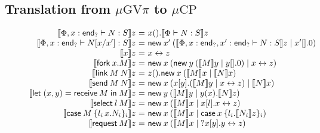 \documentclass[orivec,envcountsame]{llncs}
\makeatletter
\newcommand{\cpdual}[1]{#1^\perp}
\newcommand{\interm}{\mkwd{end}_?}
\newcommand{\cptyp}[2]{#1 \vdash #2}
\newcommand{\gvtyp}[3]{#1 \vdash #2 : #3}
\newcommand{\mkwd}[1]{\mathsf{#1}}
\newcommand{\link}[2]{#1 \leftrightarrow #2}
\newcommand{\cut}[4]{\mkwd{new}\:#1 \: (#3 \mid #4)}
\newcommand{\derelict}[2]{{?#1[#2]}}
\renewcommand{\case}[2]{\mkwd{case}\:#1\:\{#2\}}
\newcommand{\gvsend}[2]{\mkwd{send}\:#1\:#2}
\newcommand{\gvreceive}[1]{\mkwd{receive}\:#1}
\newcommand{\gvlet}[3]{\mkwd{let}\;#1 = #2\;\mkwd{in}\;#3}
\newcommand{\gvselect}[2]{\mkwd{select}\:#1\:#2}
\newcommand{\gvcase}[2]{\mkwd{case}\:#1\:\{#2\}}
\newcommand{\gvlink}[2]{\mkwd{link}\:#1\:#2}
\newcommand{\gvfork}[2]{\mkwd{fork}\:#1.#2}
\newcommand{\gvrequest}[1]{\mkwd{request}\:#1}
\newcommand{\tocp}[1]{\llbracket #1 \rrbracket}
\newcommand{\mucp}{$\mu\mathrm{CP}$\xspace}
\newcommand{\gvpi}{$\mu\mathrm{GV}\pi$\xspace}
\newcommand{\ba}{\begin{array}}
\newcommand{\ea}{\end{array}}
\newenvironment{equations}{\[\ba{@{}r@{~}c@{~}l@{}}}{\ea\]}
\makeatother
\begin{document}
\subsection{Translation from \gvpi to \mucp}\label{sec:gvpitocp}

\begin{figure}[float]
\vspace{-2ex}
\small
\begin{equations}
\tocp{\gvtyp{\Phi,x:\interm}{N}{S}}z &=& x().\tocp{\gvtyp{\Phi}{N}{S}}z \\
\tocp{\gvtyp{\Phi,x:\interm}{N[x/x']}{S}}z &=&
  \cut{x'}{}{\tocp{\gvtyp{\Phi,x:\interm,x':\interm}{N}{S}}z}{x'[].0} \\
\tocp{x}z &=& \link{x}{z} \\
\tocp{\gvfork{x}{M}}z &=& \cut{x}{}{\cut{y}{}{\tocp{M}y}{y[].0}}{\link{x}{z}} \\
\tocp{\gvlink{M}{N}}z &=& z().\cut{x}{}{\tocp{M}x}{\tocp{N}x} \\
\tocp{\gvsend{M}{N}}z &=& \cut{x}{}{x[y].(\tocp{M}y \mid \link{x}{z})}{\tocp{N}x} \\
\tocp{\gvlet{(x,y)}{\gvreceive{M}}{M}}z &=& \cut{y}{}{\tocp{M}y}{y(x).\tocp{N}z} \\
\tocp{\gvselect{l}{M}}z &=& \cut{x}{}{\tocp{M}x}{x[l].\link{x}{z}} \\
\tocp{\gvcase{M}{l_i\,x.N_i}_i}z &=&  \cut{x}{}{\tocp{M}x}{\case{x}{l_i.\tocp{N_i}z}_i} \\
\tocp{\gvrequest{M}}z &=& \cut{x}{}{\tocp{M}x}{\derelict{x}{y}.\link{y}{z}} \\

\end{equations}
\end{figure}
\end{document}
